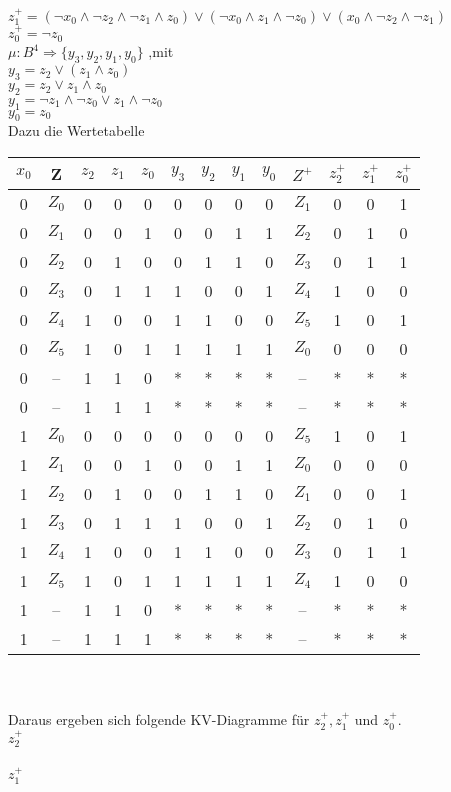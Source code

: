 \documentclass[11pt,a4paper]{article}
\begin{document}
$z^+_1= (\neg x_0 \wedge \neg z_2 \wedge \neg z_1 \wedge z_0 ) \vee ( \neg x_0 \wedge z_1 \wedge \neg z_0) \vee ( x_0 \wedge \neg z_2 \wedge \neg z_1) $\\
$z^+_0= \neg z_0$ \\
$\mu :B^4 \Rightarrow \lbrace y_3,y_2,y_1,y_0 \rbrace$ ,mit\\
$y_3=z_2 \vee (z_1 \wedge z_0 )$\\
$y_2=z_2 \vee z_1 \wedge z_0 $\\
$y_1= \neg z_1 \wedge \neg z_0 \vee z_1 \wedge \neg z_0$\\
$y_0= z_0$\\ \newpage
Dazu die Wertetabelle \\
\begin{tabular}{c | c | c | c | c | | c | c | c | c | | c | c | c | c}
$x_0$&Z&$z_2$&$z_1$&$z_0$&$y_3$&$y_2$&$y_1$&$y_0$&$Z^+$&$z^+_2$&$z^+_1$&$z^+_0$ \\ \hline
0&$Z_0$&0&0&0&0&0&0&0&$Z_1$&0&0&1\\
0&$Z_1$&0&0&1&0&0&1&1&$Z_2$&0&1&0\\
0&$Z_2$&0&1&0&0&1&1&0&$Z_3$&0&1&1\\
0&$Z_3$&0&1&1&1&0&0&1&$Z_4$&1&0&0\\
0&$Z_4$&1&0&0&1&1&0&0&$Z_5$&1&0&1\\
0&$Z_5$&1&0&1&1&1&1&1&$Z_0$&0&0&0\\
0&--&1&1&0&*&*&*&*&--&*&*&*\\
0&--&1&1&1&*&*&*&*&--&*&*&*\\ \hline
1&$Z_0$&0&0&0&0&0&0&0&$Z_5$&1&0&1\\
1&$Z_1$&0&0&1&0&0&1&1&$Z_0$&0&0&0\\
1&$Z_2$&0&1&0&0&1&1&0&$Z_1$&0&0&1\\
1&$Z_3$&0&1&1&1&0&0&1&$Z_2$&0&1&0\\
1&$Z_4$&1&0&0&1&1&0&0&$Z_3$&0&1&1\\
1&$Z_5$&1&0&1&1&1&1&1&$Z_4$&1&0&0\\
1&--&1&1&0&*&*&*&*&--&*&*&*\\
1&--&1&1&1&*&*&*&*&--&*&*&*\\
\end{tabular}\\
\\
Daraus ergeben sich folgende KV-Diagramme für $z^+_2,z^+_1$ und $z^+_0$.\\
$z^+_2$\\
\\
$z^+_1$\\
\end{document}
